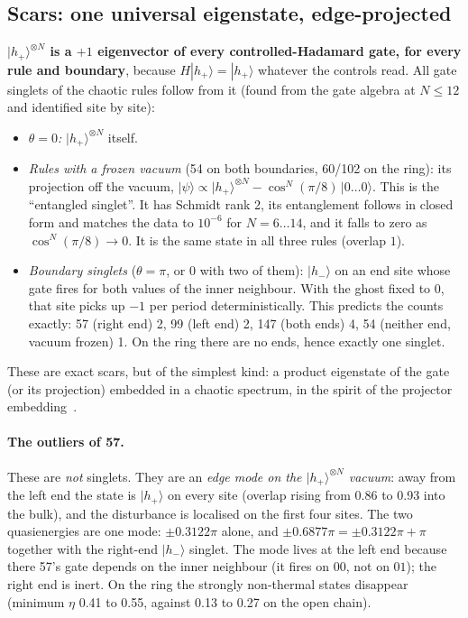 \subsection{Scars: one universal eigenstate, edge-projected}
\textbf{$|h_+\rangle^{\otimes N}$ is a $+1$ eigenvector of every controlled-Hadamard gate, for every rule and boundary},
because $H|h_+\rangle=|h_+\rangle$ whatever the controls read. All gate singlets of the chaotic rules follow from it
(found from the gate algebra at $N\le12$ and identified site by site):
\begin{itemize}
\item \emph{$\theta=0$:} $|h_+\rangle^{\otimes N}$ itself.
\item \emph{Rules with a frozen vacuum} (54 on both boundaries, 60/102 on the ring): its projection off the vacuum,
  $|\psi\rangle\propto|h_+\rangle^{\otimes N}-\cos^N(\pi/8)\,|0\ldots0\rangle$. This is the ``entangled singlet''. It has
  Schmidt rank 2, its entanglement follows in closed form and matches the data to $10^{-6}$ for $N=6\ldots14$, and it
  falls to zero as $\cos^N(\pi/8)\to0$. It is the same state in all three rules (overlap $1$).
\item \emph{Boundary singlets} ($\theta=\pi$, or $0$ with two of them): $|h_-\rangle$ on an end site whose gate fires
  for both values of the inner neighbour. With the ghost fixed to $0$, that site picks up $-1$ per period
  deterministically. This predicts the counts exactly: 57 (right end) 2, 99 (left end) 2, 147 (both ends) 4, 54 (neither
  end, vacuum frozen) 1. On the ring there are no ends, hence exactly one singlet.
\end{itemize}
These are exact scars, but of the simplest kind: a product eigenstate of the gate (or its projection) embedded in a
chaotic spectrum, in the spirit of the projector embedding~\cite{shiraishi2017}.

\paragraph{The outliers of 57.} These are \emph{not} singlets. They are an \emph{edge mode on the
$|h_+\rangle^{\otimes N}$ vacuum}: away from the left end the state is $|h_+\rangle$ on every site (overlap rising from
0.86 to 0.93 into the bulk), and the disturbance is localised on the first four sites. The two quasienergies are one
mode: $\pm0.3122\pi$ alone, and $\pm0.6877\pi=\pm0.3122\pi+\pi$ together with the right-end $|h_-\rangle$ singlet. The mode
lives at the left end because there 57's gate depends on the inner neighbour (it fires on $00$, not on $01$); the right
end is inert. On the ring the strongly non-thermal states disappear (minimum $\eta$ 0.41 to 0.55, against 0.13 to 0.27
on the open chain).

